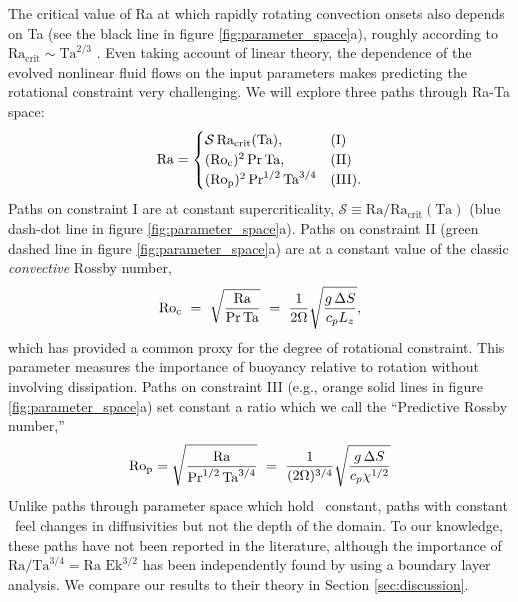 The critical value of Ra at which rapidly rotating convection onsets also depends on Ta (see the black line in figure \ref{fig:parameter_space}a),
roughly according to $\text{Ra}_{\text{crit}} \sim \text{Ta}^{2/3}$ \cite{Chandrasekhar,calkins&all2015a}.
Even taking account of linear theory, the dependence of the evolved nonlinear fluid 
flows on the input parameters makes predicting the rotational constraint very challenging. 
We will explore three paths through Ra-Ta space:
\begin{equation}
    \text{Ra} = 
    \begin{cases}
    \mathcal{S}\,\text{Ra}_\text{crit}(\text{Ta}), & (\text{I})\\
    (\text{Ro}_{\text{c}})^2 \, \text{Pr}\, \text{Ta}, & (\text{II}) \\
    (\text{Ro}_{\text{p}})^2\, \text{Pr}^{1/2}\, \text{Ta}^{3/4} & (\text{III}).
    \end{cases}
    \label{eqn:paths}
\end{equation}
Paths on constraint I are at constant supercriticality, 
$\mathcal{S} \equiv \text{Ra}/\text{Ra}_{\text{crit}}(\text{Ta})$
(blue dash-dot line in figure \ref{fig:parameter_space}a).
Paths on constraint II (green dashed line in figure \ref{fig:parameter_space}a)
are at a constant value of the classic
\textit{convective} Rossby number, 
\begin{equation}
\con \ = \   \sqrt{ \frac{\text{Ra}}{\text{Pr}\, \text{Ta} } } \ 
= \  \frac{1}{2 \Omega } \sqrt{\frac{g \, \Delta  S}{c_{p} L_{z}}},
\label{eqn:roc_defn}
\end{equation}
which has provided \cite[e.g., ][]{julien&all1996, brummell&all1996} 
a common proxy for the degree of rotational constraint.
This parameter measures the importance of buoyancy relative to rotation without 
involving dissipation.  
Paths on constraint
III (e.g., orange solid lines in figure \ref{fig:parameter_space}a) 
set constant a ratio which we call the ``Predictive Rossby number,'' 
\begin{equation}
\text{Ro}_{\text{p}} = \sqrt{\frac{\text{Ra}}{\text{Pr}^{1/2}\,\text{Ta}^{3/4}}} \ = \    
\frac{1}{(2 \Omega)^{3/4}} \sqrt{\frac{g \, \Delta  S}{c_{p} \chi^{1/2}}}
\label{eqn:rop_defn}
\end{equation}
Unlike paths through parameter space which hold \con$\,$ constant,
paths with constant \pro$\,$ 
feel changes in diffusivities but not the depth of the domain.
To our knowledge, these paths have not been reported in the literature, 
although the importance of $\text{Ra}/\text{Ta}^{3/4} = \text{Ra Ek}^{3/2}$
has been independently found by \cite{king&all2012} using a boundary layer
analysis. We compare our results to their theory in Section \ref{sec:discussion}. 

